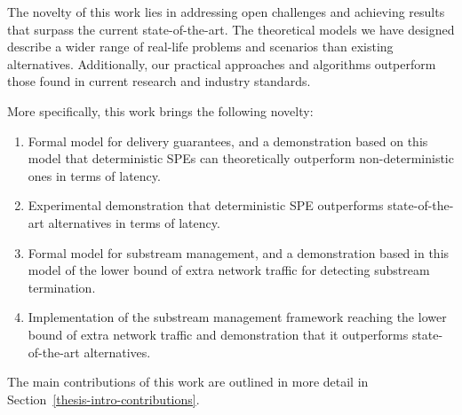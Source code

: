 The novelty of this work lies in addressing open challenges and achieving results that surpass the current state-of-the-art. The theoretical models we have designed describe a wider range of real-life problems and scenarios than existing alternatives. Additionally, our practical approaches and algorithms outperform those found in current research and industry standards. 

More specifically, this work brings the following novelty:
\begin{enumerate}
    \item Formal model for delivery guarantees, and a demonstration based on this model that deterministic SPEs can theoretically outperform non-deterministic ones in terms of latency.
    \item Experimental demonstration that deterministic SPE outperforms state-of-the-art alternatives in terms of latency.
    \item Formal model for substream management, and a demonstration based in this model of the lower bound of extra network traffic for detecting substream termination.
    \item Implementation of the substream management framework reaching the lower bound of extra network traffic and demonstration that it outperforms state-of-the-art alternatives.
\end{enumerate}
The main contributions of this work are outlined in more detail in Section~\ref{thesis-intro-contributions}.